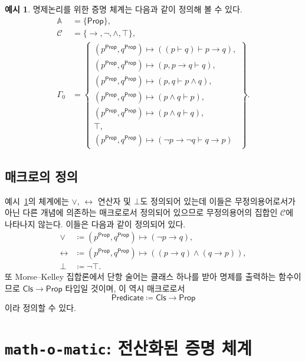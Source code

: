 \documentclass[10pt,twocolumn]{article}
\theoremstyle{definition}
\newtheorem{example}[theorem]{예시}
\newcommand{\Prop}{\mathsf{Prop}}
\newcommand{\Cls}{\mathsf{Cls}}
\newcommand{\Predicate}{\mathsf{Predicate}}
\begin{document}
\begin{example}\label{example:system}
	명제논리를 위한 증명 체계는 다음과 같이 정의해 볼 수 있다.
	\begin{align*}
		\mathbb A &= \{\mathsf{Prop}\}, \\
		\mathcal C &= \{\to, \neg, \land, \top\}, \\
		\Gamma_0 &= \left\{\begin{array}{l}
			(p^\Prop, q^\Prop)\mapsto \left((p\vdash q)\vdash p\to q\right), \\
			(p^\Prop, q^\Prop)\mapsto \left(p, p\to q\vdash q\right), \\
			(p^\Prop, q^\Prop)\mapsto \left(p, q\vdash p\land q\right), \\
			(p^\Prop, q^\Prop)\mapsto \left(p\land q\vdash p\right), \\
			(p^\Prop, q^\Prop)\mapsto \left(p\land q\vdash q\right), \\
			\top, \\
			(p^\Prop, q^\Prop)\mapsto \left(\neg p\to\neg q\vdash q\to p\right)
		\end{array}\right\}.
	\end{align*}
\end{example}

\subsection{매크로의 정의}

예시~\ref{example:system}의 체계에는 $\lor$, $\leftrightarrow$ 연산자 및 $\bot$도 정의되어 있는데 이들은 무정의용어로서가 아닌 다른 개념에 의존하는 매크로로서 정의되어 있으므로 무정의용어의 집합인 $\mathcal C$에 나타나지 않는다. 이들은 다음과 같이 정의되어 있다.
\begin{align*}
	\lor&\coloneqq (p^\Prop, q^\Prop)\mapsto \left(\neg p\to q\right), \\
	\leftrightarrow&\coloneqq (p^\Prop, q^\Prop)\mapsto \left((p\to q)\land(q\to p)\right), \\
	\bot&\coloneqq\neg\top.
\end{align*}
또 Morse--Kelley 집합론에서 단항 술어는 클래스 하나를 받아 명제를 출력하는 함수이므로 $\Cls\to\Prop$ 타입일 것이며, 이 역시 매크로로서
$$\Predicate\coloneqq\Cls\to\Prop$$
이라 정의할 수 있다.

\section{\texttt{math-o-matic}: 전산화된 증명 체계}
\end{document}
